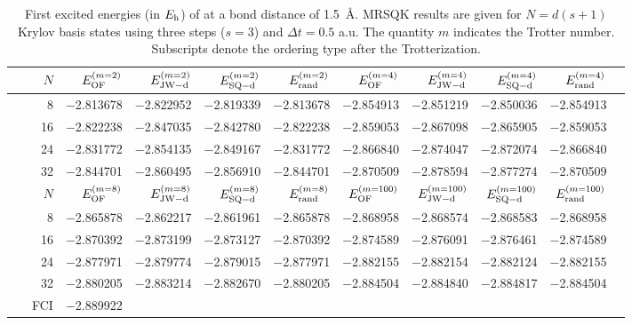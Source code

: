 \documentclass[journal=jctcce,manuscript=article]{achemso}
\newcommand*{\Eh}{$E_{\rm h}$\xspace}
\newcommand{\methodabbr}[0]{MRSQK\xspace}
\begin{document}
\begin{table}[!ht]
\centering
\renewcommand{\arraystretch}{1.1}
\caption{First excited energies (in \Eh) of  at a bond distance of 1.5~\AA{}. \methodabbr results are given for $N = d (s+1)$ Krylov basis states using three steps ($s = 3$) and $\Delta t = 0.5$ a.u.
The quantity $m$ indicates the Trotter number.
Subscripts denote the ordering type after the Trotterization. }
\footnotesize
\begin{tabular*}{\columnwidth}{@{\extracolsep{\fill}}*{1}{r}*{9}{r}@{}}    
 \toprule
     $N$     &    $E^{(m=2)}_{\rm{OF}}$    &    $E^{(m=2)}_{\rm{JW-d}}$     &   $E^{(m=2)}_{\rm{SQ-d}}$    &     $E^{(m=2)}_{\rm{rand}}$    &   $E^{(m=4)}_{\rm{OF}}$    &   $E^{(m=4)}_{\rm{JW-d}}$    &   $E^{(m=4)}_{\rm{SQ-d}}$    &    $E^{(m=4)}_{\rm{rand}}$  \\
     \midrule
  8      &   $-$2.813678   &    $-$2.822952   &    $-$2.819339   &   $-$2.813678     &   $-$2.854913    &   $-$2.851219   &   $-$2.850036   &   $-$2.854913  \\
 16       &   $-$2.822238   &    $-$2.847035   &    $-$2.842780  &   $-$2.822238     &   $-$2.859053    &   $-$2.867098   &   $-$2.865905   &   $-$2.859053  \\
  24      &   $-$2.831772   &    $-$2.854135  &    $-$2.849167   &   $-$2.831772     &   $-$2.866840   &   $-$2.874047   &   $-$2.872074   &   $-$2.866840  \\
  32      &   $-$2.844701   &    $-$2.860495   &    $-$2.856910   &   $-$2.844701     &   $-$2.870509    &   $-$2.878594   &   $-$2.877274   &   $-$2.870509  \\
 \hline
 \toprule
  $N$    &     $E^{(m=8)}_{\rm{OF}}$    &   $E^{(m=8)}_{\rm{JW-d}}$    &   $E^{(m=8)}_{\rm{SQ-d}}$   &   $E^{(m=8)}_{\rm{rand}}$   &     $E^{(m=100)}_{\rm{OF}}$    &   $E^{(m=100)}_{\rm{JW-d}}$    &   $E^{(m=100)}_{\rm{SQ-d}}$   &   $E^{(m=100)}_{\rm{rand}}$   \\
  \midrule
  8        &   $-$2.865878   &    $-$2.862217   &    $-$2.861961   &   $-$2.865878     &   $-$2.868958    &   $-$2.868574   &   $-$2.868583   &   $-$2.868958  \\
  16      &   $-$2.870392  &    $-$2.873199   &    $-$2.873127   &   $-$2.870392     &   $-$2.874589    &   $-$2.876091   &   $-$2.876461   &   $-$2.874589  \\
  24      &   $-$2.877971   &    $-$2.879774   &    $-$2.879015   &   $-$2.877971            &   $-$2.882155    &   $-$2.882154   &   $-$2.882124   &   $-$2.882155  \\
  32      &   $-$2.880205   &    $-$2.883214   &    $-$2.882670   &   $-$2.880205           &   $-$2.884504   &   $-$2.884840    &   $-$2.884817   &   $-$2.884504  \\[3pt] 
~~~FCI       &  $-$2.889922         \\  %
\bottomrule
\hline
\end{tabular*}
\label{h6_iese_table}
\end{table}
\end{document}
